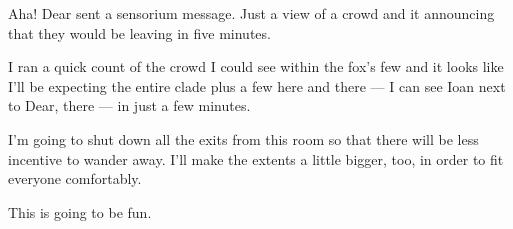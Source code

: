 Aha! Dear sent a sensorium message. Just a view of a crowd and it announcing that they would be leaving in five minutes.

I ran a quick count of the crowd I could see within the fox's few and it looks like I'll be expecting the entire clade plus a few here and there --- I can see Ioan next to Dear, there --- in just a few minutes.

I'm going to shut down all the exits from this room so that there will be less incentive to wander away. I'll make the extents a little bigger, too, in order to fit everyone comfortably.

This is going to be fun.
